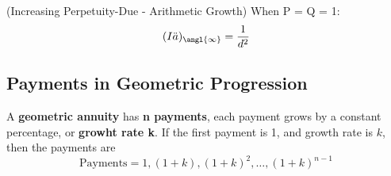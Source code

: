 \begin{definition}
    (Increasing Perpetuity-Due - Arithmetic Growth)
When P = Q = 1:
\[
  (I\ddot{a})_{\angl{\infty}} = \frac{1}{d^2}
\]
  \end{definition}



\subsection{Payments in Geometric Progression}
\begin{definition}
    A \textbf{geometric annuity} has \textbf{n payments}, each payment grows by a constant percentage, or \textbf{growht rate k}. 
    If the first payment is 1, and growth rate is $k$, then the payments are 
    \[
      \text{Payments} = 1, (1+k), (1+k)^2, \dots , (1+k)^{n-1}
    \]  
\end{definition}

